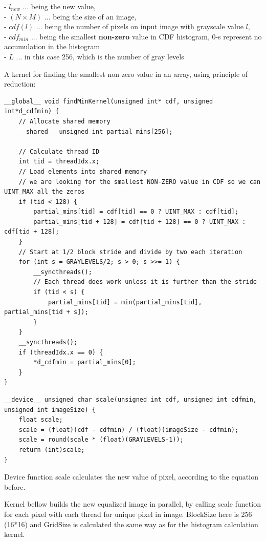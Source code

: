 \documentclass[10pt]{article}
\begin{document}
\vspace{0.3cm}


- $l_{new}$ ... being the new value,\\ - $(N \times M)$ ... being the size of an image,\\ - $cdf(l)$ ... being the number of pixels on input image with grayscale value $l$, \\ - $cdf_{min}$ ... being the smallest \textbf{non-zero} value in CDF histogram, 0-s represent no accumulation in the histogram\\ 
- $L$  ... in this case 256, which is the number of gray levels

\vspace{0.3cm}

A kernel for finding the smallest non-zero value in an array, using principle of reduction:\\
\begin{lstlisting}[style=cppstyle]
__global__ void findMinKernel(unsigned int* cdf, unsigned int*d_cdfmin) {
    // Allocate shared memory
	__shared__ unsigned int partial_mins[256];

	// Calculate thread ID
	int tid = threadIdx.x;
    // Load elements into shared memory
    // we are looking for the smallest NON-ZERO value in CDF so we can UINT_MAX all the zeros
    if (tid < 128) {
	    partial_mins[tid] = cdf[tid] == 0 ? UINT_MAX : cdf[tid];
        partial_mins[tid + 128] = cdf[tid + 128] == 0 ? UINT_MAX : cdf[tid + 128];
    }   
    // Start at 1/2 block stride and divide by two each iteration
	for (int s = GRAYLEVELS/2; s > 0; s >>= 1) {
        __syncthreads();
		// Each thread does work unless it is further than the stride
		if (tid < s) {
		    partial_mins[tid] = min(partial_mins[tid], partial_mins[tid + s]); 
	    }
	}
    __syncthreads();
	if (threadIdx.x == 0) {
        *d_cdfmin = partial_mins[0];
	}
}
\end{lstlisting}


\begin{lstlisting}[style=cppstyle]
__device__ unsigned char scale(unsigned int cdf, unsigned int cdfmin, unsigned int imageSize) {
    float scale;
    scale = (float)(cdf - cdfmin) / (float)(imageSize - cdfmin);
    scale = round(scale * (float)(GRAYLEVELS-1));
    return (int)scale;
}
\end{lstlisting}
Device function scale calculates the new value of pixel, according to the equation before.


\pagebreak
 
Kernel bellow builds the new equalized image in parallel, by calling scale function for each pixel with each thread for unique pixel in image. 
BlockSize here is 256 (16*16) and GridSize is calculated the same way as for the histogram calculation kernel.
\end{document}
